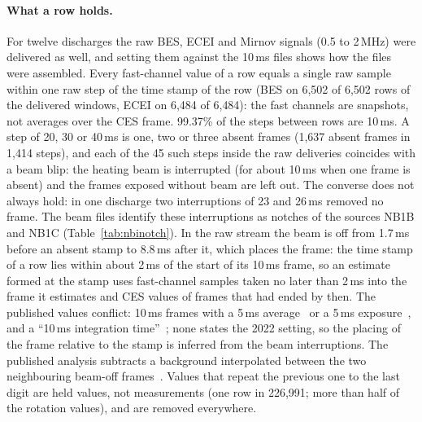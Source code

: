 \begin{table}[p]
\begin{tabular}{p{0.19\linewidth}p{0.55\linewidth}p{0.17\linewidth}}
    \bottomrule
  \end{tabular}
\end{table}

\paragraph{What a row holds.} For twelve discharges the raw BES, ECEI and Mirnov
signals (0.5 to 2\,MHz) were delivered as well, and setting them against the 10\,ms
files shows how the files were assembled. Every fast-channel value of a row equals a
single raw sample within one raw step of the time stamp of the row (BES on 6{,}502 of
6{,}502 rows of the delivered windows, ECEI on 6{,}484 of 6{,}484): the fast channels are snapshots, not averages over the CES
frame. 99.37\% of the steps between rows are 10\,ms. A step of 20, 30 or 40\,ms is
one, two or three absent frames (1{,}637 absent frames in 1{,}414 steps), and each of
the 45 such steps inside the raw deliveries coincides with a beam blip: the heating
beam is interrupted (for about 10\,ms when one frame is absent) and the frames exposed
without beam are left out. The converse does not always hold: in one discharge two interruptions of 23 and 26\,ms
removed no frame.
The beam files identify these interruptions as notches of the sources NB1B and NB1C
(Table~\ref{tab:nbinotch}). In the raw stream the beam
is off from 1.7\,ms before an absent stamp to 8.8\,ms after it, which places the
frame: the time stamp of a row lies within about 2\,ms of the start of its 10\,ms
frame, so an estimate formed at the stamp uses fast-channel samples taken no later than
2\,ms into the frame it estimates and CES values of frames that had ended by then. The
published values conflict: 10\,ms frames with a 5\,ms
average~\citep{Ko2016CharacteristicsToroidal} or a 5\,ms exposure~\citep{Lee2020TwoGaussian},
and a ``10\,ms integration time''~\citep{Jang2021DevelopmentUltrafast}; none states the
2022 setting, so the placing of the frame relative to the stamp is
inferred from the beam interruptions. The published analysis subtracts a background
interpolated between the two neighbouring beam-off frames~\citep{Lee2020TwoGaussian}. Values that repeat the
previous one to the last digit are held values, not measurements (one \Ti{} row in
226{,}991; more than half of the rotation values), and are removed everywhere.

